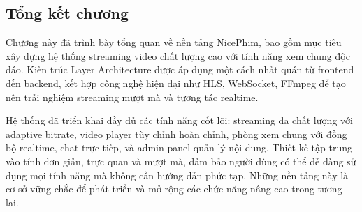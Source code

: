 \subsection{Tổng kết chương}

Chương này đã trình bày tổng quan về nền tảng NicePhim, bao gồm mục tiêu xây dựng hệ thống streaming video chất lượng cao với tính năng xem chung độc đáo. Kiến trúc Layer Architecture được áp dụng một cách nhất quán từ frontend đến backend, kết hợp công nghệ hiện đại như HLS, WebSocket, FFmpeg để tạo nên trải nghiệm streaming mượt mà và tương tác realtime.

Hệ thống đã triển khai đầy đủ các tính năng cốt lõi: streaming đa chất lượng với adaptive bitrate, video player tùy chỉnh hoàn chỉnh, phòng xem chung với đồng bộ realtime, chat trực tiếp, và admin panel quản lý nội dung. Thiết kế tập trung vào tính đơn giản, trực quan và mượt mà, đảm bảo người dùng có thể dễ dàng sử dụng mọi tính năng mà không cần hướng dẫn phức tạp. Những nền tảng này là cơ sở vững chắc để phát triển và mở rộng các chức năng nâng cao trong tương lai.
